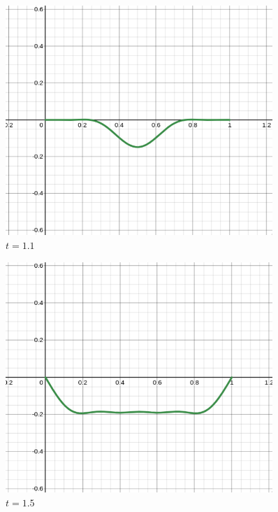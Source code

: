 \documentclass[letter, 10pts]{article}
\begin{document}
\begin{minipage}{0.5\textwidth}
\begin{figure}[H]
	\centering
	\includegraphics[width=0.9\textwidth]{../phys311/ss/dx1.png}
	\caption{$t = 1.1$}
	\label{fig:ss-c_n_001-png}
\end{figure}
\begin{figure}[H]
	\centering
	\includegraphics[width=0.9\textwidth]{../phys311/ss/dx2.png}
	\caption{$t =  1.5 $}
	\label{fig:ss-c_n_01-png}
\end{figure}
\end{minipage}
\hfill %
\end{document}
